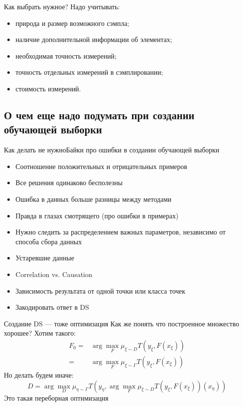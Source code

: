 \documentclass[14pt, fleqn, xcolor={dvipsnames, table}]{beamer}
\begin{document}
\begin{frame}{Как выбрать нужное?}
Надо учитывать:
\begin{itemize}
   \item природа и размер возможного сэмпла;
   \item наличие дополнительной информации об элементах;
   \item необходимая точность измерений;
   \item точность отдельных измерений в сэмплировании;
   \item стоимость измерений.
\end{itemize}
\end{frame}

\subsection{О чем еще надо подумать при создании обучающей выборки}
\begin{frame}{Как делать не нужно}{Байки про ошибки в создании обучающей выборки}
\small
\begin{itemize}
  \item Соотношение положительных и отрицательных примеров %
  \item Все решения одинаково бесполезны %
  \item Ошибка в данных больше разницы между методами %
  \item Правда в глазах смотрящего (про ошибки в примерах) %
  \item Нужно следить за распределением важных параметров, независимо от способа сбора данных %
  \item Устаревшие данные %
  \item Correlation vs. Causation %
  \item Зависимость результата от одной точки или класса точек %
  \item Закодировать ответ в DS %
\end{itemize}
\end{frame}

\begin{frame}{Создание DS --- тоже оптимизация}
\small
Как же понять что построенное множество хорошее? Хотим такого:
$$\begin{array}{rl}
F_0 =& \arg \max_{F} \mu_{\xi \sim D} T(y_{\xi}, F(x_{\xi})) \\
    =& \arg \max_{F} \mu_{\xi \sim \Gamma} T(y_{\xi}, F(x_{\xi}))
\end{array}$$
Но делать будем иначе:
$$
D = \arg \max_{D} \mu_{\eta \sim \Gamma} T(y_{\eta}, \arg \max_{F} \mu_{\xi \sim D} T(y_{\xi}, F(x_{\xi}))(x_\eta))
$$
Это такая переборная оптимизация
\end{frame}
\end{document}
